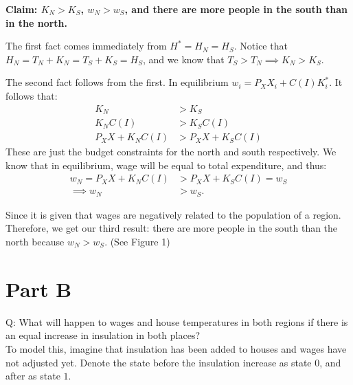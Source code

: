\documentclass[12pt]{paper}
\begin{document}
\textbf{Claim: $K_N>K_S$, $w_N>w_S$, and there are more people in the south than in the north.}

The first fact comes immediately from $H^*=H_N=H_S.$ Notice that $H_N=T_N+K_N=T_S+K_S=H_S$, and we know that $T_S>T_N \implies K_N>K_S$.

The second fact follows from the first. In equilibrium $w_i=P_XX_i+C(I)K_i^*. $ It follows that:
\begin{align*}
K_N&>K_S\\
K_NC(I)&>K_SC(I)\\
P_XX+K_NC(I)&>P_XX+K_SC(I)
\end{align*}
These are just the budget constraints for the north and south respectively. We know that in equilibrium, wage will be equal to total expenditure, and thus:
\begin{align*}
w_N=P_XX+K_NC(I)&>P_XX+K_SC(I)=w_S\\
\implies w_N&>w_S.
\end{align*}

Since it is given that wages are negatively related to the population of a region. Therefore, we get our third result: there are more people in the south than the north because $w_N>w_S$. (See Figure 1)


\section{Part B}
Q: What will happen to wages and house temperatures in both regions if there is an equal increase in insulation in both places?
\\

To model this, imagine that insulation has been added to houses and wages have not adjusted yet. Denote the state before the insulation increase as state $0$, and after as state $1$.
\end{document}
